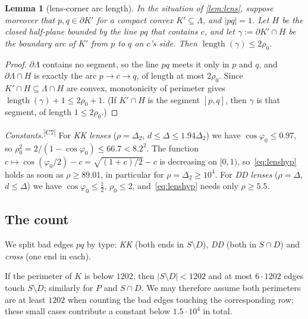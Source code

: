 \documentclass[11pt]{amsart}
\newtheorem{lemma}[theorem]{Lemma}
\theoremstyle{definition}
\theoremstyle{remark}
\newcommand{\Dt}{\Delta_2}
\newcommand{\chk}[1]{\textsuperscript{[#1]}}
\begin{document}
\begin{lemma}[lens-corner arc length]\label{lem:lenscorner}
In the situation of \cref{lem:lens}, suppose moreover that $p,q\in\partial K'$ for a compact convex $K'\subseteq\Lambda$, and $|pq|=1$. Let $H$ be the closed half-plane bounded by the line $pq$ that contains $c$, and let $\gamma:=\partial K'\cap H$ be the boundary arc of $K'$ from $p$ to $q$ on $c$'s side. Then $\operatorname{length}(\gamma)\le 2\rho_0$.
\end{lemma}
\begin{proof}
$\partial\Lambda$ contains no segment, so the line $pq$ meets it only in $p$ and $q$, and $\partial\Lambda\cap H$ is exactly the arc $p\to c\to q$, of length at most $2\rho_0$. Since $K'\cap H\subseteq\Lambda\cap H$ are convex, monotonicity of perimeter gives $\operatorname{length}(\gamma)+1\le 2\rho_0+1$. (If $K'\cap H$ is the segment $[p,q]$, then $\gamma$ is that segment, of length $1\le2\rho_0$.)
\end{proof}

\emph{Constants.}\chk{C7} For \emph{KK lenses} ($\rho=\Dt$, $d\le\Delta\le1.94\Dt$) we have $\cos\varphi_0\le 0.97$, so $\rho_0^2=2/(1-\cos\varphi_0)\le 66.7<8.2^2$. The function $c\mapsto\cos(\varphi_0/2)-c=\sqrt{(1+c)/2}-c$ is decreasing on $[0,1)$, so~\eqref{eq:lenshyp} holds as soon as $\rho\ge 89.01$, in particular for $\rho=\Dt\ge10^4$. For \emph{DD lenses} ($\rho=\Delta$, $d\le\Delta$) we have $\cos\varphi_0\le\frac12$, $\rho_0\le 2$, and~\eqref{eq:lenshyp} needs only $\rho\ge 5.5$.

\subsection{The count}
We split bad edges $pq$ by type: \emph{KK} (both ends in $S\setminus D$), \emph{DD} (both in $S\cap D$) and \emph{cross} (one end in each).

If the perimeter of $K$ is below $1202$, then $|S\setminus D|<1202$ and at most $6\cdot1202$ edges touch $S\setminus D$; similarly for $P$ and $S\cap D$. We may therefore assume both perimeters are at least $1202$ when counting the bad edges touching the corresponding row; these small cases contribute a constant below $1.5\cdot10^4$ in total.
\end{document}
